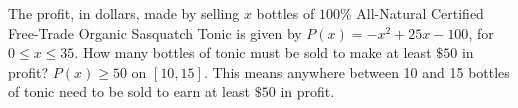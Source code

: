 {The profit, in dollars, made by selling $x$ bottles of $100 \%$ All-Natural Certified Free-Trade Organic Sasquatch Tonic is given by $P(x) = -x^2+25x-100$, for $0 \leq x \leq 35$.  How many bottles of tonic must be sold to make at least $\$50$ in profit?}
{$P(x) \geq 50$ on $[10,15]$.  This means anywhere between 10 and 15 bottles of tonic need to be sold to earn at least $\$50$ in profit.  }